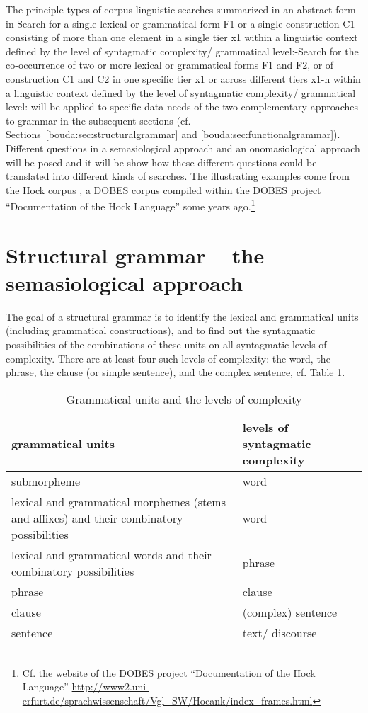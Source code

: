 The principle types of corpus linguistic searches summarized in an abstract form in Search for a single lexical or grammatical form F1 or a single construction C1 consisting of more than one element in a single tier x1 within a linguistic context defined by the level of syntagmatic complexity/ grammatical level:{}-Search for the co-occurrence of two or more lexical or grammatical forms F1 and F2, or of construction C1 and C2 in one specific tier x1 or across different tiers x1-n within a linguistic context defined by the level of syntagmatic complexity/ grammatical level: will be applied to specific data needs of the two complementary approaches to grammar in the subsequent sections (cf. Sections\ \ref{bouda:sec:structuralgrammar} and \ref{bouda:sec:functionalgrammar}). Different questions in a semasiological approach and an onomasiological approach will be posed and it will be show how these different questions could be translated into different kinds of searches. The illustrating examples come from the Hoc{\A}k corpus \citep{HartmannEtAl2009hocank}, a DOBES corpus compiled within the DOBES project ``Documentation of the Hoc{\A}k Language'' some years ago.\footnote{Cf. 
 the website of the DOBES project ``Documentation of the Hoc{\A}k Language'' \url{http://www2.uni-erfurt.de/sprachwissenschaft/Vgl_SW/Hocank/index_frames.html} 
} 

\section{Structural grammar -- the semasiological approach}
\label{bkm:Ref283033396}
\label{bouda:sec:structuralgrammar}

The goal of a structural grammar is to identify the lexical and grammatical units (including grammatical constructions), and to find out the syntagmatic possibilities of the combinations of these units on all syntagmatic levels of complexity. There are at least four such levels of complexity: the word, the phrase, the clause (or simple sentence), and the complex sentence, cf. Table  \ref{bouda:tab:gramunits}.

\begin{table}
\begin{tabular}{p{6cm}p{6cm}}
 \textbf{grammatical units} & \textbf{levels of syntagmatic complexity}\\\hline
 submorpheme & word\\\hline
 lexical and grammatical morphemes (stems and affixes) and their combinatory possibilities & word\\\hline
 lexical and grammatical words and their combinatory possibilities & phrase\\\hline
 phrase & clause\\\hline 
 clause & (complex) sentence\\\hline
 sentence & text/ discourse\\
\end{tabular}
\caption{Grammatical units and the levels of complexity}
\label{bouda:tab:gramunits}
\end{table} 


